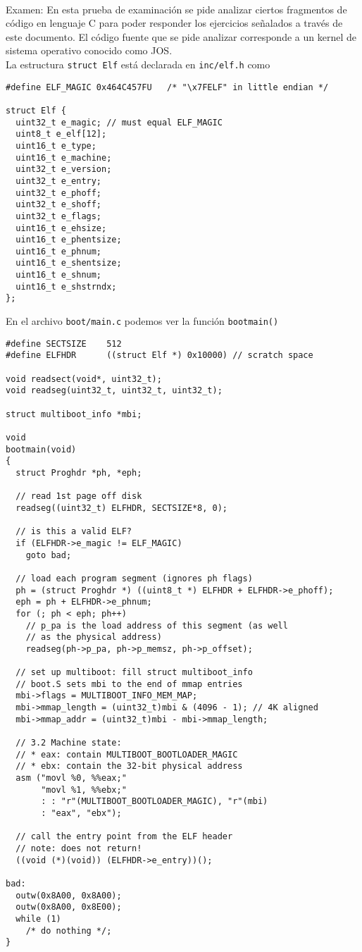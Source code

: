 \documentclass{article}
\begin{document}
\\
Examen: En esta prueba de examinaci\'on se pide analizar ciertos fragmentos 
de c\'odigo en lenguaje C para poder responder los ejercicios se\~nalados 
a trav\'es de este documento. El c\'odigo fuente que se pide analizar 
corresponde a un kernel de sistema operativo conocido como JOS.\\
\noindent La estructura {\tt struct Elf} est\'a declarada en {\tt inc/elf.h} 
como 
\begin{verbatim}
#define ELF_MAGIC 0x464C457FU	/* "\x7FELF" in little endian */

struct Elf {
  uint32_t e_magic;	// must equal ELF_MAGIC
  uint8_t e_elf[12];
  uint16_t e_type;
  uint16_t e_machine;
  uint32_t e_version;
  uint32_t e_entry;
  uint32_t e_phoff;
  uint32_t e_shoff;
  uint32_t e_flags;
  uint16_t e_ehsize;
  uint16_t e_phentsize;
  uint16_t e_phnum;
  uint16_t e_shentsize;
  uint16_t e_shnum;
  uint16_t e_shstrndx;
};
\end{verbatim}
En el archivo {\tt boot/main.c} podemos ver la funci\'on {\tt bootmain()}
\begin{verbatim}
#define SECTSIZE	512
#define ELFHDR		((struct Elf *) 0x10000) // scratch space

void readsect(void*, uint32_t);
void readseg(uint32_t, uint32_t, uint32_t);

struct multiboot_info *mbi;

void
bootmain(void)
{
  struct Proghdr *ph, *eph;

  // read 1st page off disk
  readseg((uint32_t) ELFHDR, SECTSIZE*8, 0);

  // is this a valid ELF?
  if (ELFHDR->e_magic != ELF_MAGIC)
    goto bad;
  
  // load each program segment (ignores ph flags)
  ph = (struct Proghdr *) ((uint8_t *) ELFHDR + ELFHDR->e_phoff);
  eph = ph + ELFHDR->e_phnum;
  for (; ph < eph; ph++)
    // p_pa is the load address of this segment (as well
    // as the physical address)
    readseg(ph->p_pa, ph->p_memsz, ph->p_offset);
  
  // set up multiboot: fill struct multiboot_info
  // boot.S sets mbi to the end of mmap entries
  mbi->flags = MULTIBOOT_INFO_MEM_MAP;
  mbi->mmap_length = (uint32_t)mbi & (4096 - 1); // 4K aligned
  mbi->mmap_addr = (uint32_t)mbi - mbi->mmap_length;
  
  // 3.2 Machine state:
  // * eax: contain MULTIBOOT_BOOTLOADER_MAGIC
  // * ebx: contain the 32-bit physical address
  asm ("movl %0, %%eax;"
       "movl %1, %%ebx;"
       : : "r"(MULTIBOOT_BOOTLOADER_MAGIC), "r"(mbi)
       : "eax", "ebx");
  
  // call the entry point from the ELF header
  // note: does not return!
  ((void (*)(void)) (ELFHDR->e_entry))();
  
bad:
  outw(0x8A00, 0x8A00);
  outw(0x8A00, 0x8E00);
  while (1)
    /* do nothing */;
}
\end{verbatim}
\end{document}
